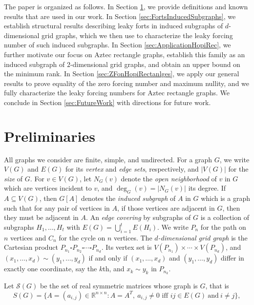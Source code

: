 \documentclass[11pt]{article}
\theoremstyle{plain} \newtheorem{question}{Question}
\theoremstyle{definition}
\begin{document}
The paper is organized as follows. In Section \ref{sec:background}, we provide definitions and known results that are used in our work. In Section \ref{sec:FortsInducedSubgraphs}, we establish structural results describing leaky forts in induced subgraphs of $d$-dimensional grid graphs, which we then use to characterize the leaky forcing number of such induced subgraphs. In Section \ref{sec:ApplicationHopiRec}, we further motivate our focus on Aztec rectangle graphs, establish this family as an induced subgraph of $2$-dimensional grid graphs, and obtain an upper bound on the minimum rank. In Section \ref{sec:ZFonHopiRectanlges}, we apply our general results to prove equality of the zero forcing number and maximum nullity, and we fully characterize the leaky forcing numbers for Aztec rectangle graphs. We conclude in Section \ref{sec:FutureWork} with directions for future work.



\section{Preliminaries}\label{sec:background}

All graphs we consider are finite, simple, and undirected. For a graph $G$, we write $V(G)$ and $E(G)$ for its \emph{vertex} and \emph{edge sets}, respectively, and $|V(G)|$ for the \emph{size} of $G$. For $v\in V(G)$, let $N_G(v)$ denote the \emph{open neighborhood} of $v$ in $G$ which are vertices incident to $v$, and $\deg_G(v)=|N_G(v)|$ its degree. If $A\subseteq V(G)$, then $G[A]$ denotes the \emph{induced subgraph} of $A$ in $G$ which is a graph such that for any pair of vertices in $A$, if those vertices are adjacent in $G$, then they must be adjacent in $A$. An \emph{edge covering} by subgraphs of $G$ is a collection of subgraphs $H_1,\dots,H_t$ with $E(G)=\bigcup_{i=1}^t E(H_i)$. We write $P_n$ for the path on $n$ vertices and $C_n$ for the cycle on $n$ vertices. The \emph{$d$-dimensional grid graph} is the Cartesian product
$P_{n_1}\square P_{n_2}\square \cdots \square P_{n_d}$. Its vertex set is
$V(P_{n_1})\times \cdots \times V(P_{n_d})$, and $(x_1,\ldots,x_d)\sim (y_1,\ldots,y_d)$ if and only if
$(x_1,\ldots,x_d)$ and $(y_1,\ldots,y_d)$ differ in exactly one coordinate, say the $k$th, and
$x_k\sim y_k$ in $P_{n_k}$.


Let $\mathcal{S}(G)$ be the set of real symmetric matrices whose graph is $G$, that is 
$$S(G) = \{A= (a_{i,j})\in \mathbb{R}^{n\times n} : A = A^T,\ a_{i,j}\ne 0 \text{ iff } ij\in E(G)\ \text{and} \ i\ne j\},$$
\end{document}
